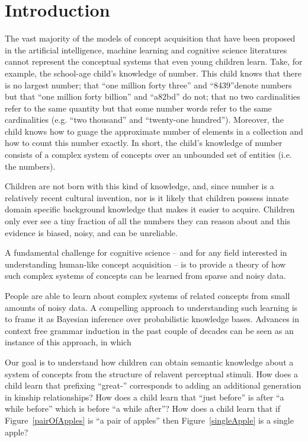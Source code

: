 \documentclass{article}
\begin{document}
\section{Introduction}
The vast majority of the models of concept acquisition that have been
proposed in the artificial intelligence, machine learning and
cognitive science literatures cannot represent the conceptual systems
that even young children learn. Take, for example, the school-age
child's knowledge of number. This child knows that there is no largest
number; that ``one million forty three'' and ``8439''denote numbers
but that ``one million forty billion'' and ``a82bd'' do not; that no
two cardinalities refer to the same quantity but that some number
words refer to the same cardinalities (e.g. ``two thousand'' and
``twenty-one hundred''). Moreover, the child knows how to guage the
approximate number of elements in a collection and how to count this
number exactly. In short, the child's knowledge of number consists of
a complex system of concepts over an unbounded set of entities
(i.e. the numbers). 

Children are not born with this kind of knowledge, and, since number
is a relatively recent cultural invention, nor is it likely that
children possess innate domain specific background knowledge that
makes it easier to acquire. Children only ever see a tiny fraction of
all the numbers they can reason about and this evidence is biased,
noisy, and can be unreliable. 

A fundamental challenge for cognitive science -- and for any field
interested in understanding human-like concept acquisition -- is to
provide a theory of how such complex systems of concepts can be
learned from sparse and noisy data.

People are able to learn about complex systems of related
concepts from small amounts of noisy data. A compelling approach to
understanding such learning is to frame it as Bayesian inference over
probabilistic knowledge bases. Advances in context free grammar
induction in the past couple of decades can be seen as an instance of
this approach, in which

Our goal is to understand how children can obtain semantic knowledge
about a system of concepts from the structure of relavent perceptual
stimuli. How does a child learn that prefixing ``great-'' corresponds
to adding an additional generation in kinship relationships? How does
a child learn that ``just before'' is after ``a while before'' which
is before ``a while after''? How does a child learn that if
Figure~\ref{pairOfApples} is ``a pair of apples'' then
Figure~\ref{singleApple} is a single apple? 
\end{document}
